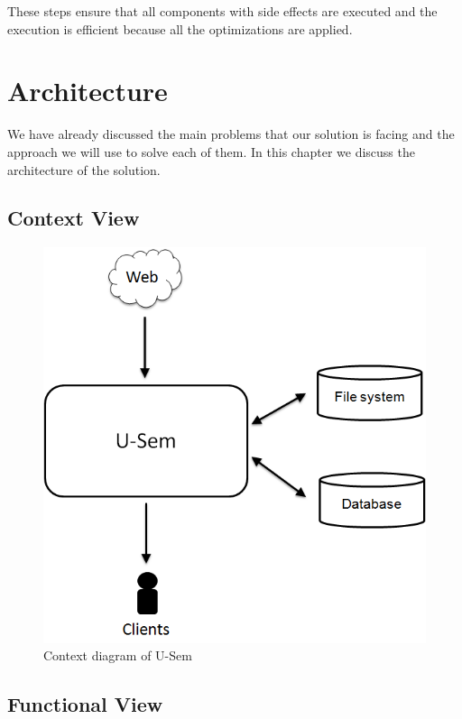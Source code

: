 \documentclass[a4paper, notitlepage]{article}
\begin{document}
These steps ensure that all components with side effects are executed and the execution is efficient because all the optimizations are applied.

\section{Architecture}
We have already discussed the main problems that our solution is facing and the approach we will use to solve each of them. In this chapter we discuss the architecture of the solution.

\subsection{Context View}

\begin{figure}[h!]
  \centering
  	\includegraphics[scale=0.4]{environment/runtime_environment_storage.png}
  \caption{Context diagram of U-Sem }
  \label{fig_context}
\end{figure}

\subsection{Functional View}
\end{document}
